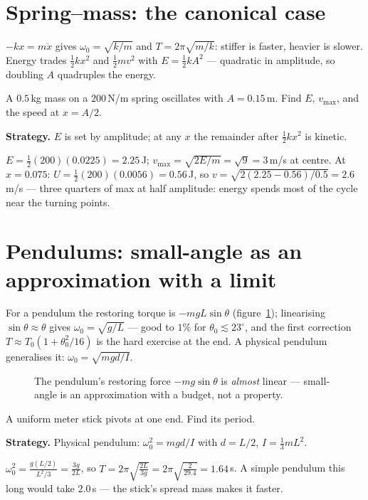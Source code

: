 \section{Spring--mass: the canonical case}\label{sec:osc-spring}

$-kx=m\ddot x$ gives $\omega_0=\sqrt{k/m}$ and
$T=2\pi\sqrt{m/k}$: stiffer is faster, heavier is slower. Energy trades
$\tfrac12kx^{2}$ and $\tfrac12mv^{2}$ with
$E=\tfrac12kA^{2}$ --- quadratic in amplitude, so doubling $A$ quadruples
the energy.

\begin{example}\label{ex:springE}
A $0.5$\,kg mass on a $200$\,N/m spring oscillates with $A=0.15$\,m.
Find $E$, $v_{\max}$, and the speed at $x=A/2$.
\par\smallskip
\textbf{Strategy.} $E$ is set by amplitude; at any $x$ the remainder
after $\tfrac12kx^{2}$ is kinetic.
\begin{solution}
$E=\tfrac12(200)(0.0225)=2.25$\,J;
$v_{\max}=\sqrt{2E/m}=\sqrt{9}=3$\,m/s at centre.
At $x=0.075$: $U=\tfrac12(200)(0.0056)=0.56$\,J, so
$v=\sqrt{2(2.25-0.56)/0.5}=2.6$\,m/s --- three quarters of max at half
amplitude: energy spends most of the cycle near the turning points.
\checkmark
\end{solution}
\end{example}

\section{Pendulums: small-angle as an approximation with a limit}\label{sec:osc-pend}

For a pendulum the restoring torque is $-mgL\sin\theta$
(figure~\ref{fig:pend}); linearising $\sin\theta\approx\theta$ gives
$\omega_0=\sqrt{g/L}$ --- good to $1\%$ for
$\theta_0\lesssim23^{\circ}$, and the first correction
$T\approx T_0(1+\theta_0^{2}/16)$ is the hard exercise at the end.
A physical pendulum generalises it:
$\omega_0=\sqrt{mgd/I}$.

\begin{figure}[htbp]\centering

\caption{The pendulum's restoring force $-mg\sin\theta$ is \emph{almost}
linear --- small-angle is an approximation with a budget, not a property.}
\label{fig:pend}
\end{figure}

\begin{example}\label{ex:physpend}
A uniform meter stick pivots at one end. Find its period.
\par\smallskip
\textbf{Strategy.} Physical pendulum: $\omega_0^{2}=mgd/I$ with $d=L/2$,
$I=\tfrac13mL^{2}$.
\begin{solution}
$\omega_0^{2}=\frac{g(L/2)}{L^{2}/3}=\frac{3g}{2L}$, so
$T=2\pi\sqrt{\frac{2L}{3g}}=2\pi\sqrt{\frac{2}{29.4}}=1.64$\,s. A simple
pendulum this long would take $2.0$\,s --- the stick's spread mass makes
it faster. \checkmark
\end{solution}
\end{example}

